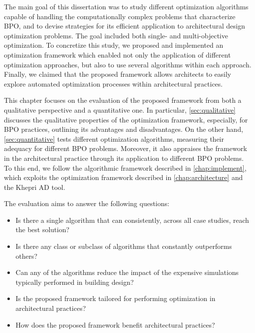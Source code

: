 \label{chap:evaluation}
 
The main goal of this dissertation was to study different optimization algorithms capable of handling the computationally complex problems that characterize \ac{BPO}, and to devise strategies for its efficient application to architectural design optimization problems. The goal included both single- and multi-objective optimization. To concretize this study, we proposed and implemented an optimization framework which enabled not only the application of different optimization approaches, but also to use several algorithms within each approach.  Finally, we claimed that the proposed framework allows architects to easily explore automated optimization processes within architectural practices. 

This chapter focuses on the evaluation of the proposed framework from both a qualitative perspective and a quantitative one. In particular, \cref{sec:qualitative} discusses the qualitative properties of the optimization framework, especially, for \ac{BPO} practices, outlining its advantages and disadvantages. On the other hand, \cref{sec:quantitative} tests different optimization algorithms, measuring their adequacy for different \ac{BPO} problems. Moreover, it also appraises the framework in the architectural practice through its application to different \ac{BPO} problems. To this end, we follow the algorithmic framework described in \cref{chap:implement}, which exploits the optimization framework described in \cref{chap:architecture} and the Khepri \ac{AD} tool. 

The evaluation aims to answer the following questions: 
\begin{itemize}
	\item Is there a single algorithm that can consistently, across all case studies, reach the best solution?
	\item Is there any class or subclass of algorithms that constantly outperforms others?
	\item Can any of the algorithms reduce the impact of the expensive simulations typically performed in building design? 
	\item Is the proposed framework tailored for performing optimization in architectural practices? 
	\item How does the proposed framework benefit architectural practices?
\end{itemize}


